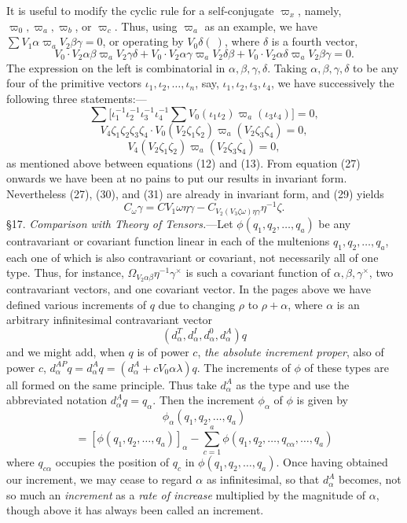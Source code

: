 \documentclass[11pt]{article}
\begin{document}
\indent It is useful to modify the cyclic rule for a self-conjugate $\varpi_x$, namely, $\varpi_0,\varpi_a,\varpi_b$, or $\varpi_c$. Thus, using $\varpi_a$ as an example, we have $\sum V_1\alpha\varpi_aV_2\beta\gamma=0$, or operating by $V_0\delta(\ )$, where $\delta$ is a fourth vector,
\[
V_0\mathbin{\cdot}V_2\alpha\beta\varpi_aV_2\gamma\delta+V_0\mathbin{\cdot}V_2\alpha\gamma\varpi_aV_2\delta\beta+V_0\mathbin{\cdot}V_2\alpha\delta\varpi_aV_2\beta\gamma=0.
\]
The expression on the left is combinatorial in $\alpha,\beta,\gamma,\delta$. Taking $\alpha,\beta,\gamma,\delta$ to be any four of the primitive vectors $\iota_1,\iota_2,\ldots,\iota_n$, say, $\iota_1,\iota_2,\iota_3,\iota_4$, we have successively the following three statements:---
\[
\sum\bigl[\iota_1^{-1}\iota_2^{-1}\iota_3^{-1}\iota_4^{-1}\sum V_0(\iota_1\iota_2)\varpi_a(\iota_3\iota_4)\bigr]=0,
\]
\[
V_4\zeta_1\zeta_2\zeta_3\zeta_4\mathbin{\cdot}V_0(V_2\zeta_1\zeta_2)\varpi_a(V_2\zeta_3\zeta_4)=0,
\]
\begin{equation}V_4(V_2\zeta_1\zeta_2)\varpi_a(V_2\zeta_3\zeta_4)=0,\tag{31}\end{equation}
as mentioned above between equations (12) and (13).
From equation (27) onwards we have been at no pains to put our results in invariant form. Nevertheless (27), (30), and (31) are already in invariant form, and (29) yields
\begin{equation}C_\omega\gamma=CV_1\omega\eta\gamma-C_{V_2(V_3\zeta\omega)\eta\gamma}\eta^{-1}\zeta.\tag{29a}\end{equation}
\indent \S17. \emph{Comparison with Theory of Tensors.}---Let $\phi(q_1,q_2,\ldots,q_a)$ be any contravariant or covariant function linear in each of the multenions $q_1,q_2,\ldots,q_a$, each one of which is also contravariant or covariant, not necessarily all of one type. Thus, for instance, $\Omega_{V_2\alpha\beta}\eta^{-1}\gamma^\times$ is such a covariant function of $\alpha,\beta,\gamma^\times$, two contravariant vectors, and one covariant vector. In the pages above we have defined various increments of $q$ due to changing $\rho$ to $\rho+\alpha$, where $\alpha$ is an arbitrary infinitesimal contravariant vector
\[
(d_\alpha^T,d_\alpha^I,d_\alpha^0,d_\alpha^A)q
\]
and we might add, when $q$ is of power $c$, \emph{the absolute increment proper}, also of power $c$, $d_\alpha^{AP}q=d_\alpha^Aq=(d_\alpha^A+cV_0\alpha\lambda)q$. The increments of $\phi$ of these types are all formed on the same principle. Thus take $d_\alpha^A$ as the type and use the abbreviated notation $d_\alpha^Aq=q_\alpha$. Then the increment $\phi_\alpha$ of $\phi$ is given by
\[
\phi_\alpha(q_1,q_2,\ldots,q_a)
\]
\[
=[\phi(q_1,q_2,\ldots,q_a)]_\alpha-\sum_{c=1}^a\phi(q_1,q_2,\ldots,q_{c\alpha},\ldots,q_a)
\]
where $q_{c\alpha}$ occupies the position of $q_c$ in $\phi(q_1,q_2,\ldots,q_a)$. Once having obtained our increment, we may cease to regard $\alpha$ as infinitesimal, so that $d_\alpha^A$ becomes, not so much an \emph{increment} as a \emph{rate of increase} multiplied by the magnitude of $\alpha$, though above it has always been called an increment.
\end{document}
